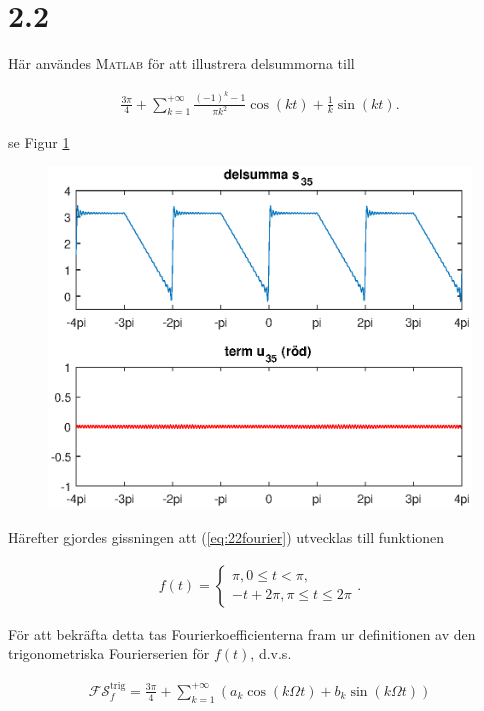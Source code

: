\documentclass[a4paper]{article}
\begin{document}
\section*{2.2}

Här användes \textsc{Matlab} för att illustrera delsummorna till

\begin{align}
  \frac{3\pi}{4} + \sum_{k=1}^{+\infty}\frac{(-1)^k-1}{\pi k^2}\cos (kt) + \frac{1}{k}\sin (kt).\label{eq:22fourier}
\end{align}

\noindent se Figur \ref{fig:serie22}

\begin{figure}[h!]
  \centering
  \includegraphics[width=0.75\linewidth]{serie22.eps}
  \caption{}
  \label{fig:serie22}
\end{figure} 

\noindent Härefter gjordes gissningen att (\ref{eq:22fourier}) utvecklas till funktionen

\begin{align*}
  f(t) =
  \begin{cases}
    \pi, 0 \leq t < \pi,\\
    -t + 2\pi, \pi \leq t \leq 2\pi
  \end{cases}.
\end{align*}

För att bekräfta detta tas Fourierkoefficienterna fram ur definitionen av
den trigonometriska Fourierserien för $f(t)$, d.v.s.

\begin{align*}
  \mathcal{FS}_f^{\text{trig}} = \frac{3\pi}{4} + \sum_{k=1}^{+\infty}\left( a_k\cos(k\Omega t) + b_k\sin(k\Omega t) \right)
\end{align*}
\end{document}
